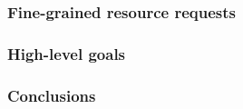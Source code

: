 

\subsubsection{\texorpdfstring{}{Virtual Cluster (VC)}}


\subsubsection{\texorpdfstring{}{Virtual Oversubscribed Cluster (VOC)}}


\subsubsection{\texorpdfstring{}{Tenant Application Graph (TAG)}}


\subsubsection{Fine-grained resource requests}


\subsubsection{High-level goals}


\subsubsection{Conclusions}
